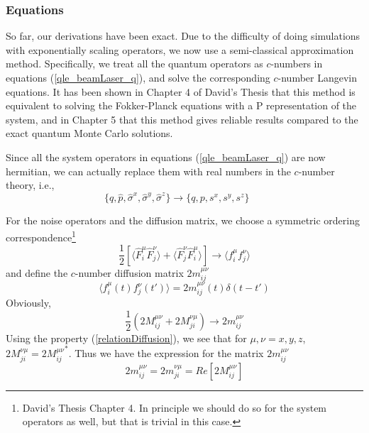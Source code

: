 \documentclass{article}
\begin{document}
\subsubsection{Equations}
So far, our derivations have been exact. Due to the difficulty of doing simulations with exponentially scaling operators, we now use a semi-classical approximation method. Specifically, we treat all the quantum operators as $c$-numbers in equations (\ref{qle_beamLaser_q}), and solve the corresponding $c$-number Langevin equations. It has been shown in Chapter 4 of David's Thesis that this method is equivalent to solving the Fokker-Planck equations with a P representation of the system, and in Chapter 5 that this method gives reliable results compared to the exact quantum Monte Carlo solutions.

Since all the system operators in equations (\ref{qle_beamLaser_q}) are now hermitian, we can actually replace them with real numbers in the $c$-number theory, i.e., 
\begin{equation}
    \{ \hat{q}, \hat{p}, \hat{\sigma}^x, \hat{\sigma}^y, \hat{\sigma}^z\} \longrightarrow \{q, p, s^x, s^y, s^z\}\ \ \ \ \ \ \ 
\end{equation}


For the noise operators and the diffusion matrix, we choose a symmetric ordering correspondence\footnote{David's Thesis Chapter 4. In principle we should do so for the system operators as well, but that is trivial in this case.}
\begin{equation}
    \frac{1}{2}\left[ \langle \hat{F}_i^\mu\hat{F}_j^\nu\rangle+\langle\hat{F}_j^\nu\hat{F}_i^\mu\rangle\right]\longrightarrow\langle  f_i^\mu f_j^\nu \rangle
\end{equation}
and define the $c$-number diffusion matrix $2m_{ij}^{\mu \nu}$
\begin{equation}
\label{def:diffusion;cNumber}
    \langle f_i^\mu(t)f_j^\nu(t')\rangle = 2m_{ij}^{\mu \nu}(t)\delta(t-t')
\end{equation}
Obviously,
\begin{equation}
    \frac{1}{2}\left(2M_{ij}^{\mu \nu}+2M_{ji}^{\nu \mu}\right) \longrightarrow 2m_{ij}^{\mu \nu}
\end{equation}
Using the property (\ref{relationDiffusion}), we see that for $\mu, \nu=x,y,z$, $2M_{ji}^{\nu \mu}={2M_{ij}^{\mu \nu}}^\ast$. Thus we have the expression for the matrix $2m_{ij}^{\mu \nu}$
\begin{equation}
    2m_{ij}^{\mu \nu} = 2m_{ji}^{\nu \mu} = Re\left[2M_{ij}^{\mu \nu}\right]
\end{equation}
\end{document}
